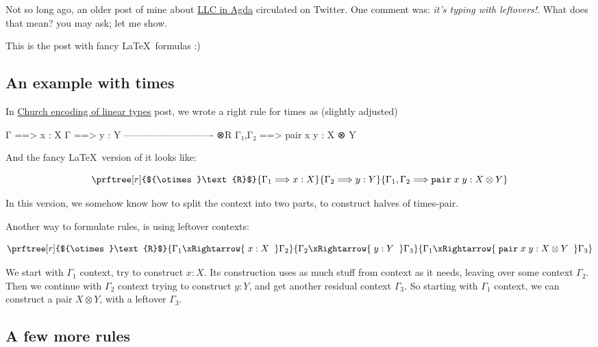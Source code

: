 \documentclass{article}
\begin{document}
Not so long ago, an older post of mine about \href{2018-07-12-llc-in-agda.html}{LLC in Agda} circulated on Twitter.
One comment was: \emph{it's typing with leftovers!}. What does that mean? you may ask; let me show.

This is the post with fancy \LaTeX\ formulas :)

\subsection{An example with times}

In \href{2019-06-26-linear-church-encodings.html}{Church encoding of linear types} post,
we wrote a right rule for times as (slightly adjusted)


\begin{code}
 Γ ==> x : X    Γ ==> y : Y
---------------------------- ⊗R
 Γ₁,Γ₂ ==> pair x y : X ⊗ Y
\end{code}

And the fancy \LaTeX\ version of it looks like:

\begin{equation*}
\prftree[r]{${\otimes}\text{R}$}{
\Gamma_1 \Longrightarrow x:X
}{
\Gamma_2 \Longrightarrow y:Y
}{
\Gamma_1,\Gamma_2 \Longrightarrow \mathtt{pair}\;x\;y : X \otimes Y
}
\end{equation*}

In this version, we somehow know how to split the context into two parts,
to construct halves of times-pair.

Another way to formulate rules, is using leftover contexts:

\begin{equation*}
\prftree[r]{${\otimes}\text{R}$}{
\Gamma_1 \xRightarrow{\displaystyle\;x:X\;\;} \Gamma_2
}{
\Gamma_2 \xRightarrow{\displaystyle\;y:Y\;\;} \Gamma_3
}{
\Gamma_1 \xRightarrow{\displaystyle\;\mathtt{pair}\;x\;y : X \otimes Y\;\;} \Gamma_3
}
\end{equation*}

We start with $\Gamma_1$ context, try to construct $x:X$. Its construction
uses as much stuff from context as it needs, leaving over some context $\Gamma_2$.
Then we continue with $\Gamma_2$ context trying to construct $y:Y$, and get
another residual context $\Gamma_3$. So starting with $\Gamma_1$ context,
we can construct a pair $X \otimes Y$, with a leftover $\Gamma_3$.

\subsection{A few more rules}
\end{document}
